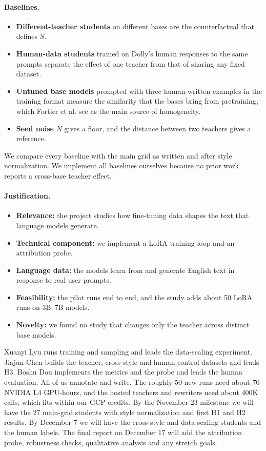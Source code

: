 \documentclass{article}
\begin{document}
\paragraph{Baselines.}
\begin{itemize}
    \item \textbf{Different-teacher students} on different bases are the counterfactual that defines $S$.
    \item \textbf{Human-data students} trained on Dolly's human responses to the same prompts separate the effect of one teacher from that of sharing any fixed dataset.
    \item \textbf{Untuned base models} prompted with three human-written examples in the training format measure the similarity that the bases bring from pretraining, which Fortier et al. see as the main source of homogeneity.
    \item \textbf{Seed noise} $N$ gives a floor, and the distance between two teachers gives a reference.
\end{itemize}
We compare every baseline with the main grid as written and after style normalization. We implement all baselines ourselves because no prior work reports a cross-base teacher effect.

\paragraph{Justification.}
\begin{itemize}
    \item \textbf{Relevance:} the project studies how fine-tuning data shapes the text that language models generate.
    \item \textbf{Technical component:} we implement a LoRA training loop and an attribution probe.
    \item \textbf{Language data:} the models learn from and generate English text in response to real user prompts.
    \item \textbf{Feasibility:} the pilot runs end to end, and the study adds about 50 LoRA runs on 3B--7B models.
    \item \textbf{Novelty:} we found no study that changes only the teacher across distinct base models.
\end{itemize}
Xuanyi Lyu runs training and sampling and leads the data-scaling experiment. Jiajun Chen builds the teacher, cross-style and human-control datasets and leads H3. Boshu Dou implements the metrics and the probe and leads the human evaluation. All of us annotate and write. The roughly 50 new runs need about 70 NVIDIA L4 GPU-hours, and the hosted teachers and rewriters need about 400K calls, which fits within our GCP credits. By the November 23 milestone we will have the 27 main-grid students with style normalization and first H1 and H2 results. By December 7 we will have the cross-style and data-scaling students and the human labels. The final report on December 17 will add the attribution probe, robustness checks, qualitative analysis and any stretch goals.

\begingroup\small


\endgroup
\end{document}
